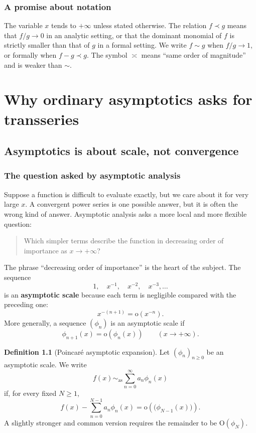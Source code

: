 \documentclass[11pt,openany]{book}
\theoremstyle{plain}
\theoremstyle{definition}
\newtheorem{definition}[theorem]{Definition}
\theoremstyle{remark}
\newcommand{\smallo}{\mathrm{o}}
\newcommand{\bigO}{\mathrm{O}}
\newcommand{\asympseries}{\sim_{\mathrm{as}}}
\newcommand{\defterm}[1]{\textbf{#1}}
\begin{document}
\section*{A promise about notation}
The variable $x$ tends to $+\infty$ unless stated otherwise. The relation $f\prec g$ means that $f/g\to0$ in an analytic setting, or that the dominant monomial of $f$ is strictly smaller than that of $g$ in a formal setting. We write $f\sim g$ when $f/g\to1$, or formally when $f-g\prec g$. The symbol $\asymp$ means ``same order of magnitude'' and is weaker than $\sim$.

\tableofcontents

\mainmatter

\part{Why ordinary asymptotics asks for transseries}

\chapter{Asymptotics is about scale, not convergence}

\section{The question asked by asymptotic analysis}
Suppose a function is difficult to evaluate exactly, but we care about it for very large $x$. A convergent power series is one possible answer, but it is often the wrong kind of answer. Asymptotic analysis asks a more local and more flexible question:

\begin{quote}
Which simpler terms describe the function in decreasing order of importance as $x\to+\infty$?
\end{quote}

The phrase ``decreasing order of importance'' is the heart of the subject. The sequence
\[
  1,\quad x^{-1},\quad x^{-2},\quad x^{-3},\ldots
\]
is an \defterm{asymptotic scale} because each term is negligible compared with the preceding one:
\[
  x^{-(n+1)}=\smallo(x^{-n}).
\]
More generally, a sequence $(\phi_n)$ is an asymptotic scale if
\[
  \phi_{n+1}(x)=\smallo(\phi_n(x))
  \qquad(x\to+\infty).
\]

\begin{definition}[Poincar\'e asymptotic expansion]
Let $(\phi_n)_{n\ge0}$ be an asymptotic scale. We write
\[
  f(x)\asympseries\sum_{n=0}^{\infty}a_n\phi_n(x)
\]
if, for every fixed $N\ge1$,
\[
  f(x)-\sum_{n=0}^{N-1}a_n\phi_n(x)=\smallo(\bigl(\phi_{N-1}(x)\bigr)).
\]
A slightly stronger and common version requires the remainder to be $\bigO(\phi_N)$.
\end{definition}
\end{document}
